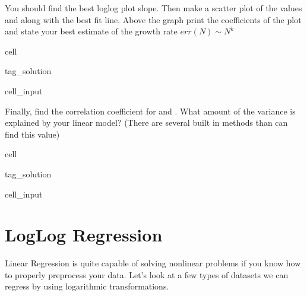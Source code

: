 \documentclass[letterpaper,10pt,english]{jupyterBook}
\begin{document}
\sphinxAtStartPar
You should find the best log\sphinxhyphen{}log plot slope. Then make a scatter plot of the values  and  along with the best fit line. Above the graph print the coefficients of the plot and state your best estimate of the growth rate \(err(N) \sim N^k\)

\begin{sphinxuseclass}{cell}
\begin{sphinxuseclass}{tag_solution}\begin{sphinxVerbatimInput}

\begin{sphinxuseclass}{cell_input}
\begin{sphinxVerbatim}[commandchars=\\\{\}]
\end{sphinxVerbatim}

\end{sphinxuseclass}\end{sphinxVerbatimInput}

\end{sphinxuseclass}
\end{sphinxuseclass}
\sphinxAtStartPar
Finally, find the correlation coefficient for  and . What amount of the variance is explained by your linear model? (There are several built in methods than can find this value)

\begin{sphinxuseclass}{cell}
\begin{sphinxuseclass}{tag_solution}\begin{sphinxVerbatimInput}

\begin{sphinxuseclass}{cell_input}
\begin{sphinxVerbatim}[commandchars=\\\{\}]
\end{sphinxVerbatim}

\end{sphinxuseclass}\end{sphinxVerbatimInput}

\end{sphinxuseclass}
\end{sphinxuseclass}
\sphinxstepscope


\chapter{Log\sphinxhyphen{}Log Regression}
\label{\detokenize{lessons/LogLogRegression:log-log-regression}}\label{\detokenize{lessons/LogLogRegression::doc}}
\sphinxAtStartPar
Linear Regression is quite capable of solving non\sphinxhyphen{}linear problems if you know how to properly pre\sphinxhyphen{}process your data. Let’s look at a few types of datasets we can regress by using logarithmic transformations.
\end{document}
